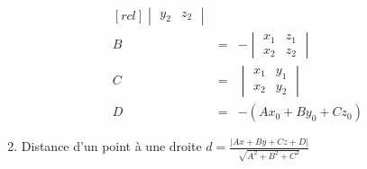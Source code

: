 \begin{adjmulticols}{1}{0in}{-2in}
\begin{enumerate}
\[\begin{matrix}[rcl]
\begin{vmatrix}
   y_2 & z_2
   \end{vmatrix}\\
   B &=& - \begin{vmatrix}
   x_1 & z_1 \\
   x_2 & z_2
   \end{vmatrix} \\
   C&=& \begin{vmatrix}
   x_1 & y_1 \\
   x_2 & y_2
   \end{vmatrix}\\
   D &=& - (Ax_0 + By_0 + Cz_0)
   \end{matrix}
   \]
\item Distance d'un point à une droite $\displaystyle
	d = \frac{|Ax + By + Cz + D|}{\sqrt{A^2 + B^2 + C^2}}$
\end{enumerate}

\end{adjmulticols}